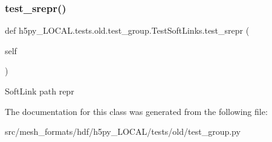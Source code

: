 \subsubsection{\texorpdfstring{test\+\_\+srepr()}{test\_srepr()}}
{\footnotesize\ttfamily def h5py\+\_\+\+L\+O\+C\+A\+L.\+tests.\+old.\+test\+\_\+group.\+Test\+Soft\+Links.\+test\+\_\+srepr (\begin{DoxyParamCaption}\item[{}]{self }\end{DoxyParamCaption})}

\begin{DoxyVerb}SoftLink path repr \end{DoxyVerb}
 

The documentation for this class was generated from the following file\+:\begin{DoxyCompactItemize}
\item 
src/mesh\+\_\+formats/hdf/h5py\+\_\+\+L\+O\+C\+A\+L/tests/old/test\+\_\+group.\+py\end{DoxyCompactItemize}
